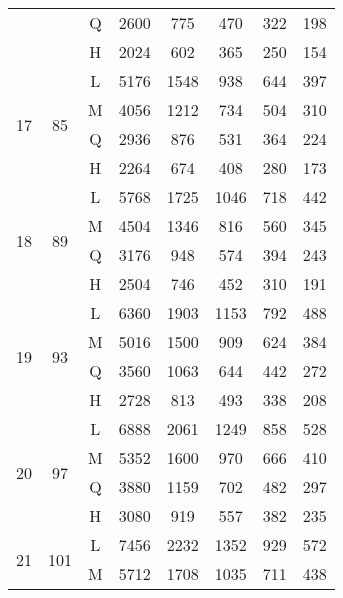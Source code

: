 \begin{table}[H]
\begin{tabular}{|c|c|c|c|c|c|c|c|}
                    &                      & Q & 2600 & 775  & 470  & 322  & 198 \\ \cline{3-8}
                    &                      & H & 2024 & 602  & 365  & 250  & 154 \\ \hline
\multirow{4}{*}{17} & \multirow{4}{*}{ 85} & L & 5176 & 1548 & 938  & 644  & 397 \\ \cline{3-8}
                    &                      & M & 4056 & 1212 & 734  & 504  & 310 \\ \cline{3-8}
                    &                      & Q & 2936 & 876  & 531  & 364  & 224 \\ \cline{3-8}
                    &                      & H & 2264 & 674  & 408  & 280  & 173 \\ \hline
\multirow{4}{*}{18} & \multirow{4}{*}{ 89} & L & 5768 & 1725 & 1046 & 718  & 442 \\ \cline{3-8}
                    &                      & M & 4504 & 1346 & 816  & 560  & 345 \\ \cline{3-8}
                    &                      & Q & 3176 & 948  & 574  & 394  & 243 \\ \cline{3-8}
                    &                      & H & 2504 & 746  & 452  & 310  & 191 \\ \hline
\multirow{4}{*}{19} & \multirow{4}{*}{ 93} & L & 6360 & 1903 & 1153 & 792  & 488 \\ \cline{3-8}
                    &                      & M & 5016 & 1500 & 909  & 624  & 384 \\ \cline{3-8}
                    &                      & Q & 3560 & 1063 & 644  & 442  & 272 \\ \cline{3-8}
                    &                      & H & 2728 & 813  & 493  & 338  & 208 \\ \hline
\multirow{4}{*}{20} & \multirow{4}{*}{ 97} & L & 6888 & 2061 & 1249 & 858  & 528 \\ \cline{3-8}
                    &                      & M & 5352 & 1600 & 970  & 666  & 410 \\ \cline{3-8}
                    &                      & Q & 3880 & 1159 & 702  & 482  & 297 \\ \cline{3-8}
                    &                      & H & 3080 & 919  & 557  & 382  & 235 \\ \hline
\multirow{4}{*}{21} & \multirow{4}{*}{101} & L & 7456 & 2232 & 1352 & 929  & 572 \\ \cline{3-8}
                    &                      & M & 5712 & 1708 & 1035 & 711  & 438 \\ \cline{3-8}

\end{tabular}
\end{table}
